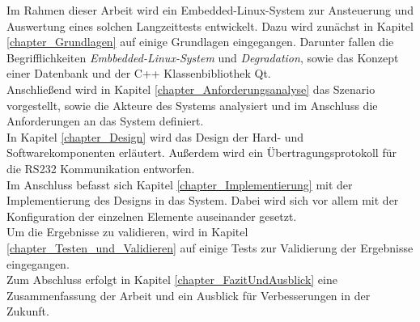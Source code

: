 Im Rahmen dieser Arbeit wird ein Embedded-Linux-System zur Ansteuerung und Auswertung eines solchen Langzeittests entwickelt. Dazu wird zunächst in Kapitel \ref{chapter_Grundlagen} auf einige Grundlagen eingegangen. Darunter fallen die Begrifflichkeiten \textit{Embbedded-Linux-System} und \textit{Degradation}, sowie das Konzept einer Datenbank und der C++ Klassenbibliothek Qt.\\
Anschließend wird in Kapitel \ref{chapter_Anforderungsanalyse} das Szenario vorgestellt, sowie die Akteure des Systems analysiert und im Anschluss die Anforderungen an das System definiert.\\
In Kapitel \ref{chapter_Design} wird das Design der Hard- und Softwarekomponenten erläutert. Außerdem wird ein Übertragungsprotokoll für die RS232 Kommunikation entworfen.\\
Im Anschluss befasst sich Kapitel \ref{chapter_Implementierung} mit der Implementierung des Designs in das System. Dabei wird sich vor allem mit der Konfiguration der einzelnen Elemente auseinander gesetzt.\\
Um die Ergebnisse zu validieren, wird in Kapitel \ref{chapter_Testen_und_Validieren} auf einige Tests zur Validierung der Ergebnisse eingegangen.\\
Zum Abschluss erfolgt in Kapitel \ref{chapter_FazitUndAusblick} eine Zusammenfassung der Arbeit und ein Ausblick für Verbesserungen in der Zukunft.